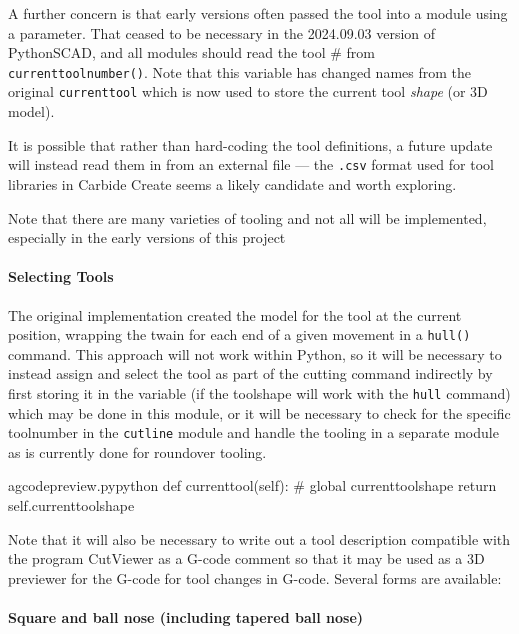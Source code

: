 \documentclass{ltxdoc}
\begin{document}
A further concern is that early versions often passed the tool into a module using a parameter. That ceased to be necessary in the 2024.09.03 version of PythonSCAD, and all modules should read the tool \# from \verb|currenttoolnumber()|. Note that this variable has changed names from the original \verb|currenttool| which is now used to store the current tool \emph{shape} (or 3D model).

It is possible that rather than hard-coding the tool definitions, a future update will instead read them in from an external file --- the \texttt{.csv} format used for tool libraries in Carbide Create seems a likely candidate and worth exploring.

Note that there are many varieties of tooling and not all will be implemented, especially in the early versions of this project
 
\paragraph{Selecting Tools}
 
The original implementation created the model for the tool at the current position, wrapping the twain for each end of a given movement in a \verb|hull()| command. This approach will not work within Python, so it will be necessary to instead assign and select the tool as part of the cutting command indirectly by first storing it in the variable  (if the toolshape will work with the \verb|hull| command) which may be done in this module, or it will be necessary to check for the specific toolnumber in the \verb|cutline| module and handle the tooling in a separate module as is currently done for roundover tooling.

\lstset{firstnumber=\thegcpy}
\begin{writecode}{a}{gcodepreview.py}{python}
    def currenttool(self):
#        global currenttoolshape
        return self.currenttoolshape

\end{writecode}
\addtocounter{gcpy}{4}

Note that it will also be necessary to write out a tool description compatible with the program CutViewer as a G-code comment so that it may be used as a 3D previewer for the G-code for tool changes in G-code. Several forms are available:

\paragraph{Square and ball nose (including tapered ball nose)}
\end{document}
